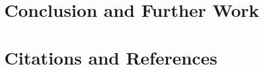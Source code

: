 \clearpage
\section{Conclusion and Further Work}


\clearpage
\section{Citations and References}
\printbibliography

\clearpage
\begin{appendices}

\clearpage

\clearpage

\clearpage
\end{appendices}


